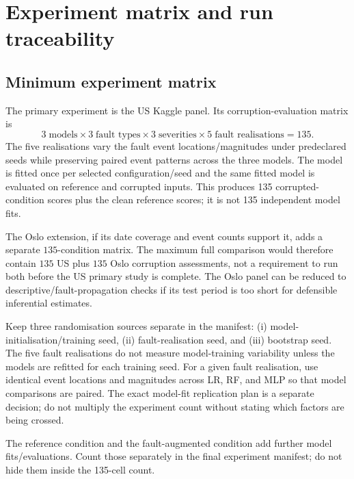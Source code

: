 \documentclass[11pt,a4paper]{article}
\begin{document}
\section{Experiment matrix and run traceability}
\label{sec:experiment}

\subsection{Minimum experiment matrix}

The primary experiment is the US Kaggle panel. Its corruption-evaluation matrix is
\begin{equation}
  3\;\text{models}\times3\;\text{fault types}\times3\;\text{severities}
  \times5\;\text{fault realisations}=135.
\end{equation}
The five realisations vary the fault event locations/magnitudes under predeclared seeds while preserving paired event patterns across the three models. The model is fitted once per selected configuration/seed and the same fitted model is evaluated on reference and corrupted inputs. This produces 135 corrupted-condition scores plus the clean reference scores; it is not 135 independent model fits.

The Oslo extension, if its date coverage and event counts support it, adds a separate $135$-condition matrix. The maximum full comparison would therefore contain $135$ US plus $135$ Oslo corruption assessments, not a requirement to run both before the US primary study is complete. The Oslo panel can be reduced to descriptive/fault-propagation checks if its test period is too short for defensible inferential estimates.

Keep three randomisation sources separate in the manifest: (i) model-initialisation/training seed, (ii) fault-realisation seed, and (iii) bootstrap seed. The five fault realisations do not measure model-training variability unless the models are refitted for each training seed. For a given fault realisation, use identical event locations and magnitudes across LR, RF, and MLP so that model comparisons are paired. The exact model-fit replication plan is a separate decision; do not multiply the experiment count without stating which factors are being crossed.

The reference condition and the fault-augmented condition add further model fits/evaluations. Count those separately in the final experiment manifest; do not hide them inside the 135-cell count.
\end{document}
